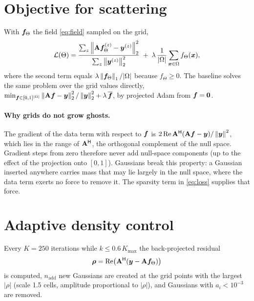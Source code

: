 \section{Objective for scattering}
With $\bm{f}_\Theta$ the field \eqref{eq:field} sampled on the grid,
\begin{equation}
  \mathcal{L}(\Theta) = \frac{\sum_z \left\lVert \mathbf{A}\bm{f}^{(z)}_\Theta-\bm{y}^{(z)} \right\rVert_2^2}{\sum_z\left\lVert \bm{y}^{(z)} \right\rVert_2^2}
  \;+\; \lambda\,\frac{1}{|\Omega|}\sum_{\bm{x}\in\Omega} f_\Theta(\bm{x}),
  \label{eq:loss}
\end{equation}
where the second term equals $\lambda\left\lVert \bm{f}_\Theta \right\rVert_1/|\Omega|$ because $f_\Theta\ge0$. The baseline solves
the same problem over the grid values directly,
$\min_{\bm{f}\in[0,1]^{|\Omega|}} \left\lVert \mathbf{A}\bm{f}-\bm{y} \right\rVert_2^2/\left\lVert \bm{y} \right\rVert_2^2+\lambda\,\overline{\bm{f}}$,
by projected Adam from $\bm{f}=\bm{0}$.

\paragraph{Why grids do not grow ghosts.} The gradient of the data term with respect to $\bm{f}$ is
$2\,\mathrm{Re}\,\mathbf{A}^{\mathsf H}(\mathbf{A}\bm{f}-\bm{y})/\left\lVert \bm{y} \right\rVert^2$, which lies in the range of
$\mathbf{A}^{\mathsf H}$, the orthogonal complement of the null space. Gradient steps from zero therefore never add
null-space components (up to the effect of the projection onto $[0,1]$). Gaussians break this property: a Gaussian
inserted anywhere carries mass that may lie largely in the null space, where the data term exerts no force to remove it.
The sparsity term in \eqref{eq:loss} supplies that force.

\section{Adaptive density control}
Every $K=250$ iterations while $k\le0.6\,K_{\max}$ the back-projected residual
\begin{equation}
  \bm{\rho} = \mathrm{Re}\big(\mathbf{A}^{\mathsf H}(\bm{y}-\mathbf{A}\bm{f}_\Theta)\big)
\end{equation}
is computed, $n_{\mathrm{add}}$ new Gaussians are created at the grid points with the largest $|\rho|$ (scale 1.5
cells, amplitude proportional to $|\rho|$), and Gaussians with $a_i<10^{-3}$ are removed.

